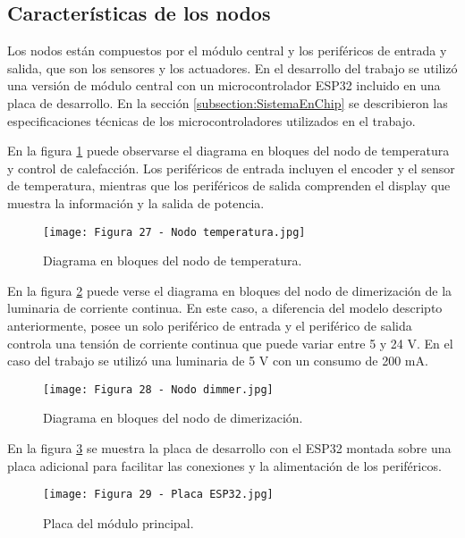\subsection{Características de los nodos}

Los nodos están compuestos por el módulo central y los periféricos de entrada y salida, que son los sensores y los actuadores. En el desarrollo del trabajo se utilizó una versión de módulo central con un microcontrolador ESP32 incluido en una placa de desarrollo. En la sección \ref{subsection:SistemaEnChip} se describieron las especificaciones técnicas de los microcontroladores utilizados en el trabajo.

En la figura \ref{fig:27} puede observarse el diagrama en bloques del nodo de temperatura y control de calefacción. Los periféricos de entrada incluyen el encoder y el sensor de temperatura, mientras que los periféricos de salida comprenden el display que muestra la información y la salida de potencia.

\newpage
\begin{figure}[h]
\centering
\texttt{[image: Figura 27 - Nodo temperatura.jpg]}
\caption[Nodo de temperatura]{Diagrama en bloques del nodo de temperatura.}
\label{fig:27}
\end{figure}

En la figura \ref{fig:28} puede verse el diagrama en bloques del nodo de dimerización de la luminaria de corriente continua. En este caso, a diferencia del modelo descripto anteriormente, posee un solo periférico de entrada y el periférico de salida controla una tensión de corriente continua que puede variar entre 5 y 24 V. En el caso del trabajo se utilizó una luminaria de 5 V con un consumo de 200 mA.

\begin{figure}[h]
\centering
\texttt{[image: Figura 28 - Nodo dimmer.jpg]}
\caption[Nodo dimmer]{Diagrama en bloques del nodo de dimerización.}
\label{fig:28}
\end{figure}

En la figura \ref{fig:29} se muestra la placa de desarrollo con el ESP32 montada sobre una placa adicional para facilitar las conexiones y la alimentación de los periféricos. 

\begin{figure}[h]
\centering
\texttt{[image: Figura 29 - Placa ESP32.jpg]}
\caption[Módulo principal]{Placa del módulo principal.}
\label{fig:29}
\end{figure}


